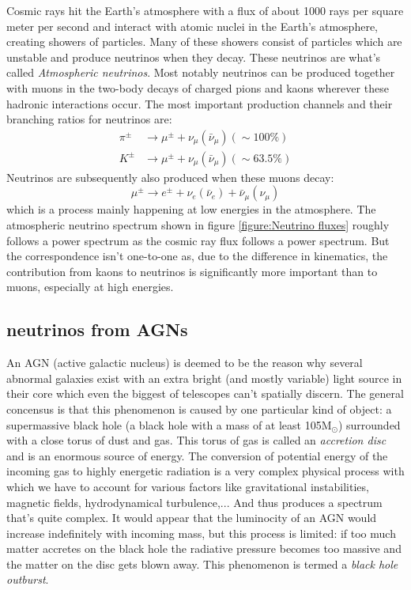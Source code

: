 Cosmic rays hit the Earth's atmosphere with a flux of about 1000 rays per
square meter per second and interact with atomic nuclei in the Earth's
atmosphere, creating showers of particles. Many of these showers consist of
particles which are unstable and produce neutrinos when they decay. These
neutrinos are what's called \textit{Atmospheric neutrinos}.  Most notably
neutrinos can be produced together with muons in the two-body decays of charged
pions and kaons wherever these hadronic interactions occur.  The most important
production channels and their branching ratios for neutrinos are:
\begin{align}
	\pi^\pm &\rightarrow \mu^\pm + \nu_\mu(\bar{\nu}_\mu) (\sim 100\%)\\
	K^\pm &\rightarrow \mu^\pm + \nu_\mu(\bar{\nu}_\mu) (\sim 63.5\%)
\end{align}
Neutrinos are subsequently also produced when these muons decay:
\begin{equation}
	\mu^\pm \rightarrow e^\pm + \nu_e(\bar{\nu}_e) + \bar{\nu}_\mu(\nu_\mu)
\end{equation}
which is a process mainly happening at low energies in the atmosphere.  The
atmospheric neutrino spectrum shown in figure \ref{figure:Neutrino
fluxes} roughly follows a power spectrum as the cosmic ray flux follows a power
spectrum. But the correspondence isn't one-to-one as, due to the difference in
kinematics, the contribution from kaons to neutrinos is significantly more
important than to muons, especially at high energies.

\subsection{neutrinos from AGNs}
An AGN (active galactic nucleus) is deemed to be the reason why several abnormal galaxies exist with
an extra bright (and mostly variable) light source in their core which even the biggest of telescopes
can't spatially discern. The general concensus is that this phenomenon is caused by one particular
kind of object: a supermassive black hole (a black hole with a mass of at least 105M$_\odot$) surrounded with
a close torus of dust and gas.
This torus of gas is called an \textit{accretion disc} and is an enormous source of energy. The conversion
of potential energy of the incoming gas to highly energetic radiation is a very complex physical process
with which we have to account for various factors like gravitational instabilities, magnetic fields, hydrodynamical
turbulence,... And thus produces a spectrum that's quite complex.
It would appear that the luminocity of an AGN would increase indefinitely with incoming mass, but this process is 
limited: if too much matter accretes on the black hole the radiative pressure becomes too massive and the 
matter on the disc gets blown away. This phenomenon is termed a \textit{black hole outburst}.

